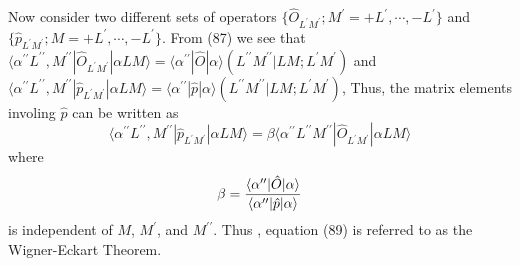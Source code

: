 Now consider two different sets of operators $\{ 
{\hat{O}}_{L^{\prime}M^{\prime}}  ; M^{\prime} = + L^{\prime} , 
\cdots , -L^{\prime} \}$ and $\{ {\hat{p}}_{L^{\prime}M^{\prime}}  ; 
M = + L^{\prime} , \cdots , -L^{\prime} \}$.  From (87) we see that
$\langle \alpha^{\prime \prime} L^{\prime \prime} , M^{\prime 
\prime} | {\hat{O}}_{L^{\prime}M^{\prime}} | \alpha LM \rangle = 
\langle \alpha^{\prime \prime} | {\hat{O}} | \alpha \rangle ( 
L^{\prime \prime} M^{\prime \prime} | L M ; L^{\prime} 
M^{\prime})$ and 
$\langle \alpha^{\prime \prime} L^{\prime \prime} , M^{\prime 
\prime} | {\hat{p}}_{L^{\prime}M^{\prime}} | \alpha LM \rangle = 
\langle \alpha^{\prime \prime} | {\hat{p}} | \alpha \rangle ( 
L^{\prime \prime} M^{\prime \prime} | L M ; L^{\prime} 
M^{\prime})$,  Thus, the matrix elements involing ${\hat{p}}$ can be 
written as
\begin{equation}
\langle \alpha^{\prime \prime} L^{\prime \prime} , M^{\prime 
\prime} | {\hat{p}}_{L^{\prime}M^{\prime}} | \alpha LM \rangle = \beta
\langle \alpha^{\prime \prime} L^{\prime \prime} M^{\prime \prime} |
{\hat{O}}_{L^{\prime} M^{\prime}} | \alpha LM \rangle
\label{chap16-eqno89}
\end{equation}
where
\begin{equation}
\beta = {\langle \alpha^{\prime \prime} | {\hat{O}} | \alpha \rangle 
\over \langle \alpha^{\prime \prime} | {\hat{p}} | \alpha \rangle}
\end{equation}
is independent of $M$, $M^{\prime}$, and $M^{\prime \prime}$.  Thus ,
equation (89) is referred to as the Wigner-Eckart Theorem.

